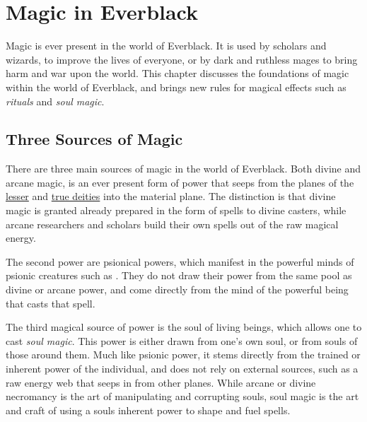\chapter{Magic in Everblack}
\label{sec:Magic}

Magic is ever present in the world of Everblack. It is used by scholars and
wizards, to improve the lives of everyone, or by dark and ruthless mages to
bring harm and war upon the world. This chapter discusses the foundations of
magic within the world of Everblack, and brings new rules for magical effects
such as \emph{rituals} and \emph{soul magic}.

\section{Three Sources of Magic}

There are three main sources of magic in the world of Everblack. Both divine
and arcane magic, is an ever present form of power that seeps from the planes
of the \hyperref[sec:Lesser Deities]{lesser} and \hyperref[sec:True
  Deities]{true deities} into the material plane. The distinction is that
divine magic is granted already prepared in the form of spells to divine
casters, while arcane researchers and scholars build their own spells out of
the raw magical energy.

The second power are psionical powers, which manifest in the powerful minds of
psionic creatures such as . They do not draw their power
from the same pool as divine or arcane power, and come directly from the mind
of the powerful being that casts that spell.

The third magical source of power is the soul of living beings, which allows
one to cast \emph{soul magic}. This power is either drawn from one's own soul,
or from souls of those around them. Much like psionic power, it stems directly
from the trained or inherent power of the individual, and does not rely on
external sources, such as a raw energy web that seeps in from other planes.
While arcane or divine necromancy is the art of manipulating and corrupting
souls, soul magic is the art and craft of using a souls inherent power to
shape and fuel spells.






